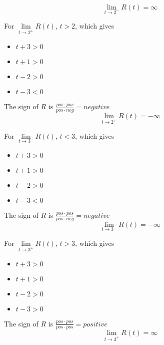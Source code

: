 \documentclass{ximera}
\begin{document}
\begin{example}
\begin{explanation}
\[
\lim\limits_{t \to 2^-}R(t) = \infty
\]






For $\lim\limits_{t \to 2^+}R(t)$,  $t > 2$, which gives

\begin{itemize}
\item $t + 3 > 0$
\item $t + 1 > 0$
\item $t - 2 > 0$
\item $t - 3 < 0$
\end{itemize}


The sign of $R$ is $\frac{pos \cdot pos}{pos \cdot neg} = negative$ \\



\[
\lim\limits_{t \to 2^+}R(t) = -\infty
\]





For $\lim\limits_{t \to 3^-}R(t)$,  $t < 3$, which gives

\begin{itemize}
\item $t + 3 > 0$
\item $t + 1 > 0$
\item $t - 2 > 0$
\item $t - 3 < 0$
\end{itemize}


The sign of $R$ is $\frac{pos \cdot pos}{pos \cdot neg} = negative$ \\



\[
\lim\limits_{t \to 3^-}R(t) = -\infty
\]







For $\lim\limits_{t \to 3^+}R(t)$,  $t > 3$, which gives

\begin{itemize}
\item $t + 3 > 0$
\item $t + 1 > 0$
\item $t - 2 > 0$
\item $t - 3 > 0$
\end{itemize}


The sign of $R$ is $\frac{pos \cdot pos}{pos \cdot pos} = positive$ \\



\[
\lim\limits_{t \to 3^+}R(t) = \infty
\]









\end{explanation}
\end{example}
\end{document}
